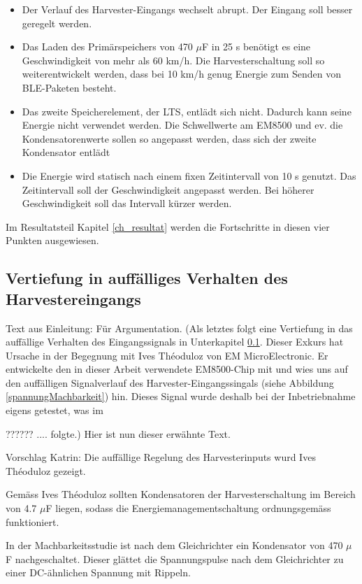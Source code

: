 \begin{itemize}
     \item Der Verlauf des Harvester-Eingangs wechselt abrupt. Der Eingang soll besser geregelt werden. 
     \item Das Laden des Primärspeichers von 470 $\mu$F in 25 s benötigt es eine Geschwindigkeit von mehr als 60 km/h.  Die Harvesterschaltung soll so weiterentwickelt werden, dass bei 10 km/h genug Energie zum Senden von BLE-Paketen besteht.    
     \item Das zweite Speicherelement, der LTS, entlädt sich nicht. Dadurch kann seine Energie nicht verwendet werden. Die Schwellwerte am EM8500 und ev. die Kondensatorenwerte sollen so angepasst werden, dass sich der zweite Kondensator entlädt
     \item Die Energie wird statisch nach einem fixen Zeitintervall von 10 s genutzt. Das Zeitintervall soll der Geschwindigkeit angepasst werden. Bei höherer Geschwindigkeit soll das Intervall kürzer werden.
\end{itemize} 


Im Resultatsteil Kapitel \ref{ch_resultat} werden die Fortschritte in diesen vier Punkten ausgewiesen.

\subsection{Vertiefung in auffälliges Verhalten des Harvestereingangs}\label{auffaellig} 


Text aus Einleitung: Für Argumentation. (Als letztes folgt eine Vertiefung in das auffällige Verhalten des Eingangssignals in Unterkapitel \ref{auffaellig}. Dieser Exkurs hat Ursache in der Begegnung mit  Ives Théoduloz von EM MicroElectronic. Er entwickelte den in dieser Arbeit verwendete EM8500-Chip mit und wies uns auf den auffälligen Signalverlauf des Harvester-Eingangssingals (siehe Abbildung \ref{spannungMachbarkeit}) hin. Dieses Signal wurde deshalb bei der Inbetriebnahme eigens getestet, was im 

??????  .... folgte.) Hier ist nun dieser erwähnte Text.

Vorschlag Katrin:
Die auffällige Regelung des Harvesterinputs wurd Ives Théoduloz gezeigt. 

Gemäss Ives Théoduloz sollten Kondensatoren der Harvesterschaltung im Bereich von 4.7 $\mu$F liegen, sodass die Energiemanagementschaltung ordnungsgemäss funktioniert.  


In der Machbarkeitsstudie ist nach dem Gleichrichter ein Kondensator von 470 $\mu$F nachgeschaltet. Dieser glättet die Spannungspulse nach dem Gleichrichter zu einer DC-ähnlichen Spannung mit Rippeln.

